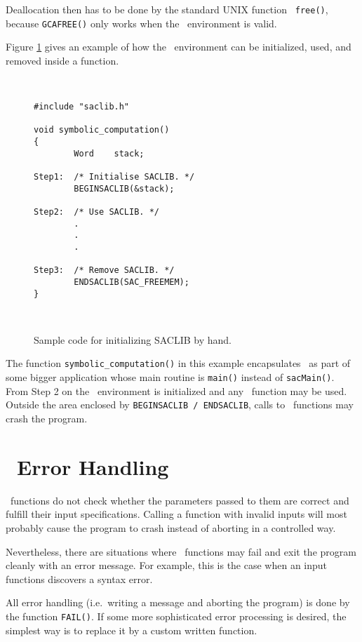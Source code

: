 \begin{description}
\begin{itemize}
    Deallocation then has to be done by the standard UNIX function {\tt
    free()}, because {\tt GCAFREE()} only works when the \saclib\
    environment is valid.
  \end{itemize}
\end{description}

Figure \ref{f:IS} gives an example of how the \saclib\ environment can be
initialized, used, and removed inside a function.

\begin{figure}[htb]
\ \hrulefill\ \small
\begin{verbatim}
#include "saclib.h"

void symbolic_computation()
{
        Word    stack;

Step1:  /* Initialise SACLIB. */
        BEGINSACLIB(&stack);

Step2:  /* Use SACLIB. */
        .
        .
        .

Step3:  /* Remove SACLIB. */
        ENDSACLIB(SAC_FREEMEM);
}
\end{verbatim}
\ \hrulefill\ \normalsize
\caption{Sample code for initializing SACLIB by hand.}
\label{f:IS}
\end{figure}

The function {\tt symbolic\_computation()} in this example encapsulates
\saclib\ as part of some bigger application whose main routine is {\tt main()}
instead of {\tt sacMain()}. From Step 2 on the \saclib\ environment is
initialized and any \saclib\ function may be used. Outside the area enclosed
by {\tt BEGINSACLIB / ENDSACLIB}, calls to \saclib\ functions may crash the
program.


\section{\saclib\ Error Handling}
\label{c:CFC s:EH}

\saclib\ functions do not check whether the parameters passed to them are
correct and fulfill their input specifications. Calling a function with
invalid inputs will most probably cause the program to crash instead of
aborting in a controlled way.

Nevertheless, there are situations where \saclib\ functions may fail and
exit the program cleanly with an error message. For example, this is the
case when an input functions discovers a syntax error.

All error handling (i.e.\ writing a message and aborting the program) is
done by the function {\tt FAIL()}. If some more sophisticated error
processing is desired, the simplest way is to replace it by a custom
written function.


